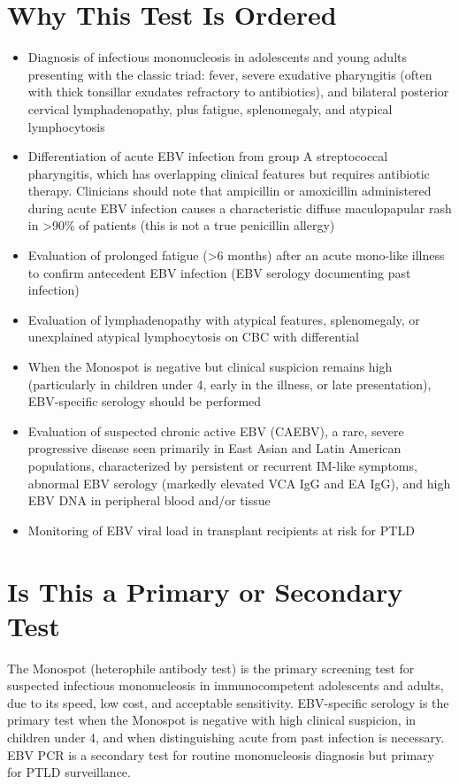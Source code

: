 \section*{Why This Test Is Ordered}
\begin{itemize}
  \item Diagnosis of infectious mononucleosis in adolescents and young adults presenting with the classic triad: fever, severe exudative pharyngitis (often with thick tonsillar exudates refractory to antibiotics), and bilateral posterior cervical lymphadenopathy, plus fatigue, splenomegaly, and atypical lymphocytosis
  \item Differentiation of acute EBV infection from group A streptococcal pharyngitis, which has overlapping clinical features but requires antibiotic therapy. Clinicians should note that ampicillin or amoxicillin administered during acute EBV infection causes a characteristic diffuse maculopapular rash in >90\% of patients (this is not a true penicillin allergy)
  \item Evaluation of prolonged fatigue (\textgreater 6 months) after an acute mono-like illness to confirm antecedent EBV infection (EBV serology documenting past infection)
  \item Evaluation of lymphadenopathy with atypical features, splenomegaly, or unexplained atypical lymphocytosis on CBC with differential
  \item When the Monospot is negative but clinical suspicion remains high (particularly in children under 4, early in the illness, or late presentation), EBV-specific serology should be performed
  \item Evaluation of suspected chronic active EBV (CAEBV), a rare, severe progressive disease seen primarily in East Asian and Latin American populations, characterized by persistent or recurrent IM-like symptoms, abnormal EBV serology (markedly elevated VCA IgG and EA IgG), and high EBV DNA in peripheral blood and/or tissue
  \item Monitoring of EBV viral load in transplant recipients at risk for PTLD
\end{itemize}

\section*{Is This a Primary or Secondary Test}
The Monospot (heterophile antibody test) is the primary screening test for suspected infectious mononucleosis in immunocompetent adolescents and adults, due to its speed, low cost, and acceptable sensitivity. EBV-specific serology is the primary test when the Monospot is negative with high clinical suspicion, in children under 4, and when distinguishing acute from past infection is necessary. EBV PCR is a secondary test for routine mononucleosis diagnosis but primary for PTLD surveillance.

